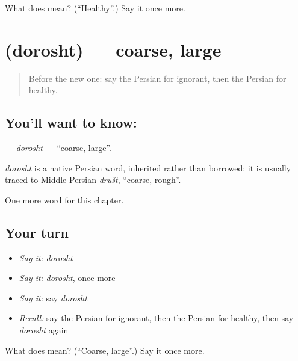 \begin{tcolorbox}[breakable,colback=teal!4,colframe=teal!35!black,title={Before you move on}]
What does  mean? (\textquotedblleft{}Healthy\textquotedblright{}.) Say it once more.
\end{tcolorbox}
\section[\texorpdfstring{\fa{درشت} (dorosht)}{درشت (dorosht)}]{ (dorosht) — coarse, large}

\label{lesson:FA-C130-dorosht}



\begin{quote}
Before the new one: say the Persian for ignorant, then the Persian for healthy.
\end{quote}

\subsection*{You'll want to know: }
\textbf{} — \emph{dorosht} — \textquotedblleft{}coarse, large\textquotedblright{}.

\begin{cousinweb}
\emph{dorosht} is a native Persian word, inherited rather than borrowed; it is usually traced to Middle Persian \emph{društ}, \textquotedblleft{}coarse, rough\textquotedblright{}.
\end{cousinweb}

\begin{grammarlens}[title={What you've built}]
One more word for this chapter.
\end{grammarlens}

\subsection*{Your turn}
\begin{itemize}
\raggedright
  \item \emph{Say it:} \emph{dorosht}
  \item \emph{Say it:} \emph{dorosht}, once more
  \item \emph{Say it:} say \emph{dorosht}
  \item \emph{Recall:} say the Persian for ignorant, then the Persian for healthy, then say \emph{dorosht} again
\end{itemize}

\begin{tcolorbox}[breakable,colback=teal!4,colframe=teal!35!black,title={Before you move on}]
What does  mean? (\textquotedblleft{}Coarse, large\textquotedblright{}.) Say it once more.
\end{tcolorbox}

